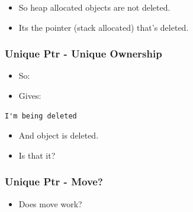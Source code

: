 \begin{itemize}
\itemsep1pt\parskip0pt
\item
  So heap allocated objects are not deleted.
\item
  Its the pointer (stack allocated) that's deleted.
\end{itemize}

\subsubsection{Unique Ptr - Unique
Ownership}\label{unique-ptr---unique-ownership}

\begin{itemize}
\itemsep1pt\parskip0pt
\item
  So:
\end{itemize}

\begin{Shaded}
\begin{Highlighting}[]
 
   \NormalTok{,}\NormalTok{));}
\NormalTok{\}}

\end{Highlighting}
\end{Shaded}

\begin{itemize}
\itemsep1pt\parskip0pt
\item
  Gives:
\end{itemize}

\begin{verbatim}
I'm being deleted
\end{verbatim}

\begin{itemize}
\itemsep1pt\parskip0pt
\item
  And object is deleted.
\item
  Is that it?
\end{itemize}

\subsubsection{Unique Ptr - Move?}\label{unique-ptr---move}

\begin{itemize}
\itemsep1pt\parskip0pt
\item
  Does move work?
\end{itemize}

